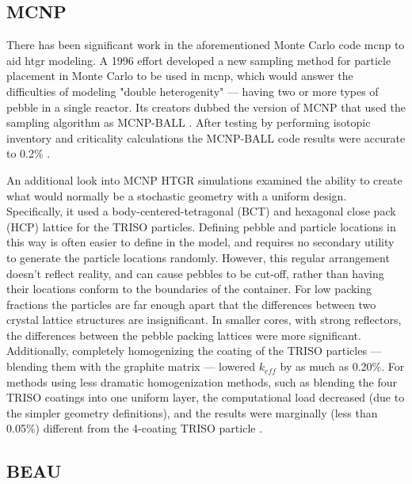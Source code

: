 \subsection{MCNP}
\label{sec:mcnp-beau}

There has been significant work in the aforementioned Monte Carlo code \acrshort{mcnp} to aid \acrshort{htgr} modeling.  A 1996 effort developed a new sampling method for particle placement in Monte Carlo to be used in \acrshort{mcnp}, which would answer the difficulties of modeling "double heterogenity" --- having two or more types of pebble in a single reactor.  Its creators dubbed the version of MCNP that used the sampling algorithm as MCNP-BALL \cite{murata_new_1997}.  After testing by performing isotopic inventory and criticality calculations the MCNP-BALL code results were accurate to 0.2\% \cite{murata_new_1997}.

An additional look into MCNP HTGR simulations examined the ability to create what would normally be a stochastic geometry with a uniform design.  Specifically, it used a body-centered-tetragonal (BCT) and hexagonal close pack (HCP) lattice for the TRISO particles.  Defining pebble and particle locations in this way is often easier to define in the model, and requires no secondary utility to generate the particle locations randomly.  However, this regular arrangement doesn't reflect reality, and can cause pebbles to be cut-off, rather than having their locations conform to the boundaries of the container.  For low packing fractions the particles are far enough apart that the differences between two crystal lattice structures are insignificant.  In smaller cores, with strong reflectors, the differences between the pebble packing lattices were more significant.  Additionally, completely homogenizing the coating of the TRISO particles --- blending them with the graphite matrix --- lowered $k_{eff}$ by as much as 0.20\%.  For methods using less dramatic homogenization methods, such as blending the four TRISO coatings into one uniform layer, the computational load decreased (due to the simpler geometry definitions), and the results were marginally (less than 0.05\%) different from the 4-coating TRISO particle \cite{karriem_mcnp_2001}.

\subsection{BEAU}

